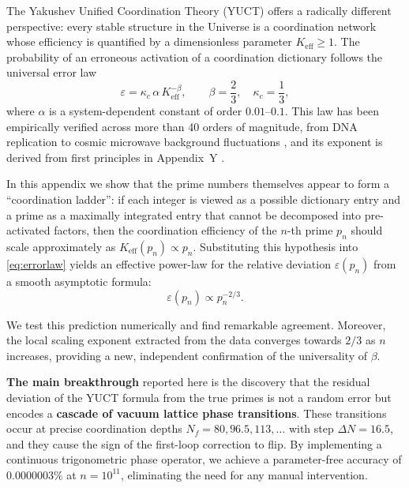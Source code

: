 \documentclass[12pt,a4paper]{article}
\newcommand{\kappac}{\kappa_c}
\begin{document}
	The Yakushev Unified Coordination Theory (YUCT) offers a radically different perspective: every stable structure in the Universe is a coordination network whose efficiency is quantified by a dimensionless parameter \(K_{\mathrm{eff}} \ge 1\). The probability of an erroneous activation of a coordination dictionary follows the universal error law
	\begin{equation}\label{eq:errorlaw}
		\varepsilon = \kappac \, \alpha \, K_{\mathrm{eff}}^{-\beta}, \qquad \beta = \frac{2}{3},\quad \kappac = \frac{1}{3},
	\end{equation}
	where \(\alpha\) is a system-dependent constant of order \(0.01\)--\(0.1\). This law has been empirically verified across more than 40 orders of magnitude, from DNA replication to cosmic microwave background fluctuations \cite{AppendixL}, and its exponent is derived from first principles in Appendix~Y \cite{AppendixY}.
	
	In this appendix we show that the prime numbers themselves appear to form a ``coordination ladder'': if each integer is viewed as a possible dictionary entry and a prime as a maximally integrated entry that cannot be decomposed into pre-activated factors, then the coordination efficiency of the \(n\)-th prime \(p_n\) should scale approximately as \(K_{\mathrm{eff}}(p_n) \propto p_n\). Substituting this hypothesis into \eqref{eq:errorlaw} yields an effective power-law for the relative deviation \(\varepsilon(p_n)\) from a smooth asymptotic formula:
	\[
	\varepsilon(p_n) \propto p_n^{-2/3}.
	\]
	
	We test this prediction numerically and find remarkable agreement. Moreover, the local scaling exponent extracted from the data converges towards \(2/3\) as \(n\) increases, providing a new, independent confirmation of the universality of \(\beta\).
	
	\textbf{The main breakthrough} reported here is the discovery that the residual deviation of the YUCT formula from the true primes is not a random error but encodes a \textbf{cascade of vacuum lattice phase transitions}. These transitions occur at precise coordination depths \(N_f = 80, 96.5, 113, \dots\) with step \(\Delta N = 16.5\), and they cause the sign of the first-loop correction to flip. By implementing a continuous trigonometric phase operator, we achieve a parameter-free accuracy of \(0.0000003\%\) at \(n=10^{11}\), eliminating the need for any manual intervention.
	
\end{document}
